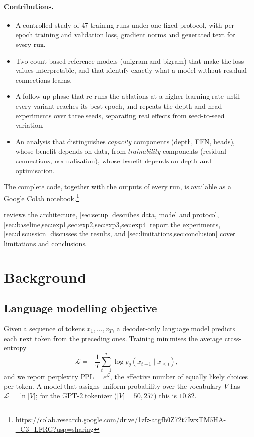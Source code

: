 \documentclass[11pt,a4paper]{article}
\newcommand{\colaburl}{https://colab.research.google.com/drive/1zfz-atgfb0Z72t7IwxTM5HA-_C3_LFRG?usp=sharing}
\begin{document}
\paragraph{Contributions.}
\begin{itemize}[leftmargin=*]
  \item A controlled study of 47 training runs under one fixed protocol, with per-epoch training and validation loss, gradient norms and generated text for every run.
  \item Two count-based reference models (unigram and bigram) that make the loss values interpretable, and that identify exactly what a model without residual connections learns.
  \item A follow-up phase that re-runs the ablations at a higher learning rate until every variant reaches its best epoch, and repeats the depth and head experiments over three seeds, separating real effects from seed-to-seed variation.
  \item An analysis that distinguishes \emph{capacity} components (depth, FFN, heads), whose benefit depends on data, from \emph{trainability} components (residual connections, normalisation), whose benefit depends on depth and optimisation.
\end{itemize}

The complete code, together with the outputs of every run, is available as a Google Colab notebook.\footnote{\url{\colaburl}}

 reviews the architecture, \cref{sec:setup} describes data, model and protocol, \cref{sec:baseline,sec:exp1,sec:exp2,sec:exp3,sec:exp4} report the experiments, \cref{sec:discussion} discusses the results, and \cref{sec:limitations,sec:conclusion} cover limitations and conclusions.

\section{Background}\label{sec:background}

\subsection{Language modelling objective}
Given a sequence of tokens $x_1,\dots,x_T$, a decoder-only language model predicts each next token from the preceding ones. Training minimises the average cross-entropy
\begin{equation}
  \mathcal{L} = -\frac{1}{T}\sum_{t=1}^{T}\log p_\theta\!\left(x_{t+1}\mid x_{\le t}\right),
\end{equation}
and we report perplexity $\mathrm{PPL}=e^{\mathcal{L}}$, the effective number of equally likely choices per token. A model that assigns uniform probability over the vocabulary $V$ has $\mathcal{L}=\ln|V|$; for the GPT-2 tokenizer ($|V| = 50{,}257$) this is $10.82$.
\end{document}

